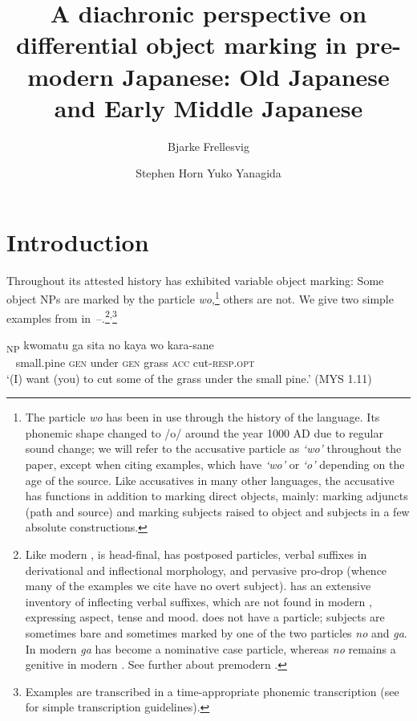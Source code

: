 \documentclass[output=paper]{LSP/langsci}
\author{Bjarke Frellesvig\affiliation{University of Oxford}\and 
Stephen Horn\affiliation{University of Oxford}\lastand 
Yuko Yanagida\affiliation{University of Tsukuba}}
\title{A diachronic perspective on differential object marking in pre-modern Japanese: Old Japanese and Early Middle Japanese}
\begin{document}
\section{Introduction}
\label{07-sec:1} 

Throughout its attested history  has exhibited variable object
marking: Some object NPs are marked by the  particle
\textit{wo},\footnote{The  particle \textit{wo} has been in
 use through the history of the language. Its phonemic shape changed
 to /o/ around the year 1000 AD due to regular sound change; we will
 refer to the  accusative particle as \textit{‘wo’} throughout
 the paper, except when citing examples, which have \textit{‘wo’} or
\textit{‘o’} depending on the age of the source. Like accusatives in
 many other languages, the  accusative has functions in
 addition to marking direct objects, mainly: marking adjuncts (path
 and source) and marking subjects raised to object and subjects in a
 few absolute constructions.} others are not. 
 We give two simple
examples from 
in~–.\footnote{Like
 modern ,  is head-final, has postposed
 particles, verbal suffixes in derivational and inflectional
 morphology, and pervasive pro-drop (whence many of the examples we
 cite have no overt subject).  has an extensive inventory
 of inflecting verbal suffixes, which are not found in modern
 , expressing aspect, tense and mood.  does not
 have a  particle; subjects are sometimes bare and
 sometimes marked by one of the two  particles \textit{no}
 and \textit{ga}. In modern  \textit{ga} has become a nominative
 case particle, whereas \textit{no} remains a genitive in modern
 . See further \citet{Frellesvig2010Japanese} about premodern
 .}\textsuperscript{,}\footnote{Examples are transcribed in a time-appropriate
 phonemic transcription (see \citealt[33, 176]{Frellesvig2010Japanese}
 for simple transcription guidelines). 
 }

\ea \label{07-fr-ex:1}
\gll {\ob}\textsubscript{NP} kwomatu ga	sita no	kaya wo{\cb}	kara-sane\\
~ small.pine \textsc{gen}	under \textsc{gen}	grass \textsc{acc}	cut-\textsc{resp}.\textsc{opt}\\
\glt ‘(I) want (you) to cut some of the grass under the small pine.’   (MYS 1.11)
\z
\end{document}
